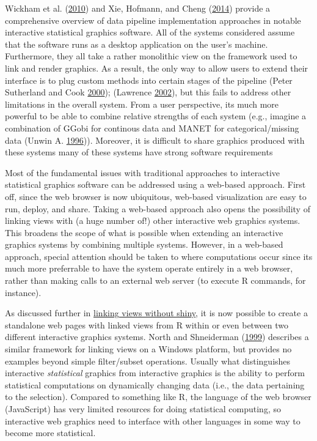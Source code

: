 \documentclass[12pt,]{isuthesis}
\begin{document}
Wickham et al. (\protect\hyperlink{ref-plumbing}{2010}) and Xie,
Hofmann, and Cheng (\protect\hyperlink{ref-Xie:2014co}{2014}) provide a
comprehensive overview of data pipeline implementation approaches in
notable interactive statistical graphics software. All of the systems
considered assume that the software runs as a desktop application on the
user's machine. Furthermore, they all take a rather monolithic view on
the framework used to link and render graphics. As a result, the only
way to allow users to extend their interface is to plug custom methods
into certain stages of the pipeline (Peter Sutherland and Cook
\protect\hyperlink{ref-orca}{2000}); (Lawrence
\protect\hyperlink{ref-ggobi-pipeline-design}{2002}), but this fails to
address other limitations in the overall system. From a user
perspective, its much more powerful to be able to combine relative
strengths of each system (e.g., imagine a combination of GGobi for
continous data and MANET for categorical/missing data (Unwin A.
\protect\hyperlink{ref-MANET}{1996})). Moreover, it is difficult to
share graphics produced with these systems many of these systems have
strong software requirements

Most of the fundamental issues with traditional approaches to
interactive statistical graphics software can be addressed using a
web-based approach. First off, since the web browser is now ubiquitous,
web-based visualization are easy to run, deploy, and share. Taking a
web-based approach also opens the possibility of linking views with (a
huge number of!) other interactive web graphics systems. This broadens
the scope of what is possible when extending an interactive graphics
systems by combining multiple systems. However, in a web-based approach,
special attention should be taken to where computations occur since its
much more preferrable to have the system operate entirely in a web
browser, rather than making calls to an external web server (to execute
R commands, for instance).

As discussed further in
\protect\hyperlink{linking-views-without-shiny}{linking views without
shiny}, it is now possible to create a standalone web pages with linked
views from R within or even between two different interactive graphics
systems. North and Shneiderman
(\protect\hyperlink{ref-North:1999vi}{1999}) describes a similar
framework for linking views on a Windows platform, but provides no
examples beyond simple filter/subset operations. Usually what
distinguishes interactive \emph{statistical} graphics from interactive
graphics is the ability to perform statistical computations on
dynamically changing data (i.e., the data pertaining to the selection).
Compared to something like R, the language of the web browser
(JavaScript) has very limited resources for doing statistical computing,
so interactive web graphics need to interface with other languages in
some way to become more statistical.
\end{document}
